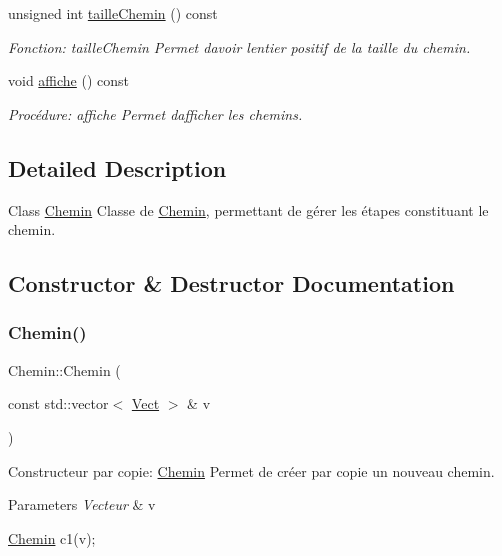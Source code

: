 \begin{DoxyCompactItemize}
unsigned int \hyperlink{classChemin_ad02f568d7966d0ce0184fb008ecf20bc}{taille\+Chemin} () const
\begin{DoxyCompactList}\small\item\em Fonction\+: taille\+Chemin Permet d\textquotesingle{}avoir l\textquotesingle{}entier positif de la taille du chemin. \end{DoxyCompactList}\item 
void \hyperlink{classChemin_a3fdd4a56b105cf6da6e20cd3462583f6}{affiche} () const
\begin{DoxyCompactList}\small\item\em Procédure\+: affiche Permet d\textquotesingle{}afficher les chemins. \end{DoxyCompactList}\end{DoxyCompactItemize}


\subsection{Detailed Description}
Class \hyperlink{classChemin}{Chemin} Classe de \hyperlink{classChemin}{Chemin}, permettant de gérer les étapes constituant le chemin. 

\subsection{Constructor \& Destructor Documentation}
\mbox{\label{classChemin_acbb44d2dd9c7eda79740c3ddb2b435c5}} 
\subsubsection{\texorpdfstring{Chemin()}{Chemin()}}
{\footnotesize\ttfamily Chemin\+::\+Chemin (\begin{DoxyParamCaption}\item[{const std\+::vector$<$ \hyperlink{classVect}{Vect} $>$ \&}]{v }\end{DoxyParamCaption})}



Constructeur par copie\+: \hyperlink{classChemin}{Chemin} Permet de créer par copie un nouveau chemin. 


\begin{DoxyParams}{Parameters}
{\em Vecteur} & v 
\begin{DoxyCode}
\hyperlink{classChemin}{Chemin} c1(v);
\end{DoxyCode}
 \\
\hline
\end{DoxyParams}


